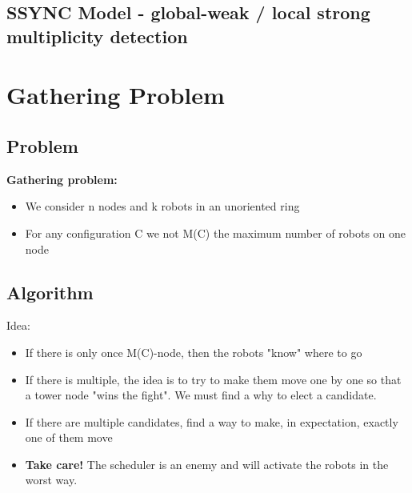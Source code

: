 \documentclass{beamer}
\begin{document}
\subsection{SSYNC Model - global-weak / local strong multiplicity detection}

\section{Gathering Problem}
\subsection{Problem}
\begin{frame}
\textbf{Gathering problem:}

	\begin{itemize}
		\item<2-> We consider n nodes and k robots in an unoriented ring
		\item<3-> For any configuration C we not M(C) the maximum number of robots on one node
	\end{itemize}
	
\end{frame}

\subsection{Algorithm}
\begin{frame}
	Idea: 
	\begin{itemize}
		\item If there is only once M(C)-node, then the robots "know" where to go
		\item If there is multiple, the idea is to try to make them move one by one so that a tower node "wins the fight". We must find a why to elect a candidate.
		\item If there are multiple candidates, find a way to make, in expectation, exactly one of them move
		\item<2-> \textbf{Take care!} The scheduler is an enemy and will activate the robots in the worst way.
	\end{itemize}
	
\end{frame}
\end{document}
